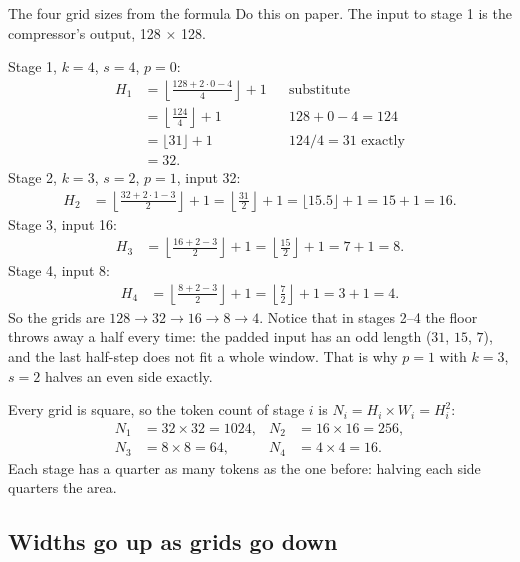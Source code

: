 \begin{worked}[label={we:encoder:grids}]{The four grid sizes from the formula}
Do this on paper. The input to stage 1 is the compressor's output, 128 $\times$ 128.

Stage 1, $k=4$, $s=4$, $p=0$:
\begin{align*}
H_1 &= \left\lfloor \frac{128 + 2\cdot 0 - 4}{4} \right\rfloor + 1 && \text{substitute}\\
    &= \left\lfloor \frac{124}{4} \right\rfloor + 1 && \text{$128 + 0 - 4 = 124$}\\
    &= \lfloor 31 \rfloor + 1 && \text{$124/4 = 31$ exactly}\\
    &= 32 .
\end{align*}
Stage 2, $k=3$, $s=2$, $p=1$, input 32:
\begin{align*}
H_2 &= \left\lfloor \frac{32 + 2\cdot 1 - 3}{2} \right\rfloor + 1
     = \left\lfloor \frac{31}{2} \right\rfloor + 1
     = \lfloor 15.5 \rfloor + 1
     = 15 + 1 = 16 .
\end{align*}
Stage 3, input 16:
\begin{align*}
H_3 &= \left\lfloor \frac{16 + 2 - 3}{2} \right\rfloor + 1
     = \left\lfloor \frac{15}{2} \right\rfloor + 1
     = 7 + 1 = 8 .
\end{align*}
Stage 4, input 8:
\begin{align*}
H_4 &= \left\lfloor \frac{8 + 2 - 3}{2} \right\rfloor + 1
     = \left\lfloor \frac{7}{2} \right\rfloor + 1
     = 3 + 1 = 4 .
\end{align*}
So the grids are $128 \to 32 \to 16 \to 8 \to 4$. Notice that in stages 2--4 the floor throws away a
half every time: the padded input has an odd length ($31$, $15$, $7$), and the last half-step does not
fit a whole window. That is why $p = 1$ with $k = 3$, $s = 2$ halves an even side exactly.
\end{worked}

Every grid is square, so the token count of stage $i$ is $N_i = H_i \times W_i = H_i^2$:
\begin{align*}
N_1 &= 32 \times 32 = 1024, & N_2 &= 16 \times 16 = 256,\\
N_3 &= 8 \times 8 = 64,     & N_4 &= 4 \times 4 = 16.
\end{align*}
Each stage has a quarter as many tokens as the one before: halving each side quarters the area.

\subsection{Widths go up as grids go down}

